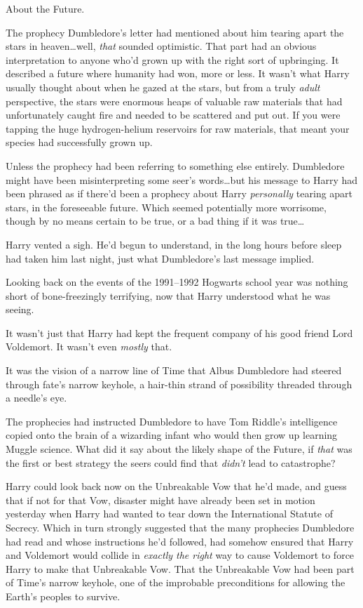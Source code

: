 About the Future.

The prophecy Dumbledore’s letter had mentioned about him tearing apart the stars in heaven…well, \emph{that} sounded optimistic. That part had an obvious interpretation to anyone who’d grown up with the right sort of upbringing. It described a future where humanity had won, more or less. It wasn’t what Harry usually thought about when he gazed at the stars, but from a truly \emph{adult} perspective, the stars were enormous heaps of valuable raw materials that had unfortunately caught fire and needed to be scattered and put out. If you were tapping the huge hydrogen-helium reservoirs for raw materials, that meant your species had successfully grown up.

Unless the prophecy had been referring to something else entirely. Dumbledore might have been misinterpreting some seer’s words…but his message to Harry had been phrased as if there’d been a prophecy about Harry \emph{personally} tearing apart stars, in the foreseeable future. Which seemed potentially more worrisome, though by no means certain to be true, or a bad thing if it was true…

Harry vented a sigh. He’d begun to understand, in the long hours before sleep had taken him last night, just what Dumbledore’s last message implied.

Looking back on the events of the 1991–1992 Hogwarts school year was nothing short of bone-freezingly terrifying, now that Harry understood what he was seeing.

It wasn’t just that Harry had kept the frequent company of his good friend Lord Voldemort. It wasn’t even \emph{mostly} that.

It was the vision of a narrow line of Time that Albus Dumbledore had steered through fate’s narrow keyhole, a hair-thin strand of possibility threaded through a needle’s eye.

The prophecies had instructed Dumbledore to have Tom Riddle’s intelligence copied onto the brain of a wizarding infant who would then grow up learning Muggle science. What did it say about the likely shape of the Future, if \emph{that} was the first or best strategy the seers could find that \emph{didn’t} lead to catastrophe?

Harry could look back now on the Unbreakable Vow that he’d made, and guess that if not for that Vow, disaster might have already been set in motion yesterday when Harry had wanted to tear down the International Statute of Secrecy. Which in turn strongly suggested that the many prophecies Dumbledore had read and whose instructions he’d followed, had somehow ensured that Harry and Voldemort would collide in \emph{exactly the right} way to cause Voldemort to force Harry to make that Unbreakable Vow. That the Unbreakable Vow had been part of Time’s narrow keyhole, one of the improbable preconditions for allowing the Earth’s peoples to survive.

